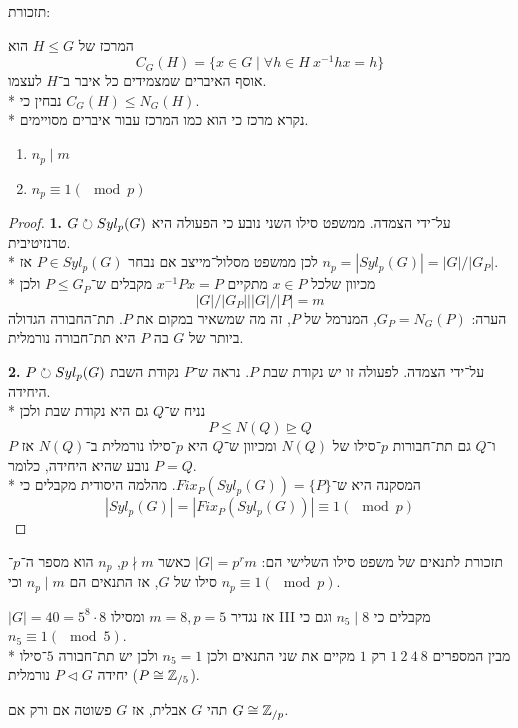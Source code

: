 תזכורת:
\begin{definition}[מרכז]
	המרכז של $H \le G$ הוא
	\[
		C_G(H) = \{ x \in G \mid \forall h \in H\ x^{-1} h x = h \}
	\]
	אוסף האיברים שמצמידים כל איבר ב־$H$ לעצמו. \\*
	נבחין כי $C_G(H) \le N_G(H)$. \\*
	נקרא מרכז כי הוא כמו המרכז עבור איברים מסויימים.
\end{definition}
\begin{theorem}
	\begin{enumerate}
		\item $n_p \mid m$
		\item $n_p \equiv 1 (\mod p)$
	\end{enumerate}
\end{theorem}
\begin{proof}
	\textbf{1.}
	$G \circlearrowright Syl_p(G)$ על־ידי הצמדה.
	ממשפט סילו השני נובע כי הפעולה היא טרנזיטיבית. \\*
	לכן ממשפט מסלול־מייצב אם נבחר $P \in Syl_p(G)$ אז $n_p = |Syl_p(G)| = |G| / |G_P|$. \\*
	מכיוון שלכל $x \in P$ מתקיים $x^{-1} P x = P$ מקבלים ש־$P \le G_P$ ולכן
	\[
		|G| / |G_P| \Big| |G|/|P| = m
	\]
	הערה: $G_P = N_G(P)$, המנרמל של $P$, זה מה שמשאיר במקום את $P$. תת־החבורה הגדולה ביותר של $G$ בה $P$ היא תת־חבורה נורמלית.

	\textbf{2.}
	$P \circlearrowright Syl_p(G)$ על־ידי הצמדה.
	לפעולה זו יש נקודת שבת $P$.
	נראה ש־$P$ נקודת השבת היחידה. \\*
	נניח ש־$Q$ גם היא נקודת שבת ולכן
	\[
		P \le N(Q) \trianglerighteq Q
	\]
	$P$ ו־$Q$ גם תת־חבורות $p$־סילו של $N(Q)$ ומכיוון ש־$Q$ היא $p$־סילו נורמלית ב־$N(Q)$ אז נובע שהיא היחידה, כלומר $P = Q$. \\*
	המסקנה היא ש־$Fix_P(Syl_p(G)) = \{ P \}$.
	מהלמה היסודית מקבלים כי
	\[
		|Syl_p(G)| = |Fix_P(Syl_p(G))| \equiv 1 (\mod p)
	\]
\end{proof}
תזכורת לתנאים של משפט סילו השלישי הם: $|G| = p^r m$ כאשר $p \nmid m$, $n_p$ הוא מספר ה־$p$־סילו של $G$, אז התנאים הם $n_p \mid m$ וכי $n_p \equiv 1 (\mod p)$.
\begin{example}
	$|G| = 40 = 5^8 \cdot 8$ אז נגדיר $m = 8, p = 5$ ומסילו III מקבלים כי $n_5 \mid 8$ וגם כי $n_5 \equiv 1 (\mod 5)$. \\*
	מבין המספרים $1\ 2\ 4\ 8$ רק $1$ מקיים את שני התנאים ולכן $n_5 = 1$ ולכן יש תת־חבורה $5$־סילו יחידה $P \triangleleft G$ נורמלית ($P \cong \mathbb{Z}_{/5}$).
\end{example}
\begin{proposition}
	תהי $G$ אבלית, אז $G$ פשוטה אם ורק אם $G \cong \mathbb{Z}_{/p}$.
\end{proposition}
